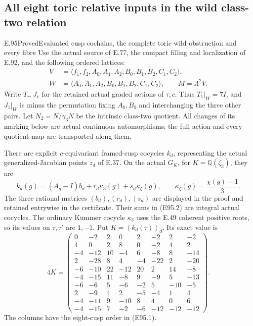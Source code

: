 \subsection{All eight toric relative inputs in the wild class-two relation}

\begin{statement}{E.95}{Proved}{Evaluated cusp cochains, the complete toric wild obstruction and every fibre}
Use the actual source of E.77, the compact filling and localization
of E.92, and the following ordered lattices:
\[
 \begin{aligned}
 V&=\langle f_1,f_2,A_0,A_1,A_2,B_0,B_1,B_2,C_1,C_2\rangle,\\
 W&=\langle A_0,A_1,A_2,B_0,B_1,B_2,C_1,C_2\rangle,
 \qquad M=\Lambda^2V.
 \end{aligned}
 \tag{E95.1}
\]
Write $T_r,J_r$ for the retained actual graded actions of
$\tau,c$. Thus $T_1|_W=7I$, and $J_1|_W$ is minus the
permutation fixing $A_0,B_0$ and interchanging the three other
pairs. Let $N_2=N/\gamma_3N$ be the intrinsic class-two quotient.
All changes of its marking below are actual continuous
automorphisms; the full action and every quotient map are
transported along them.

There are explicit $c$-equivariant framed-cusp cocycles
$k_d$, representing the actual generalized-Jacobian points
$z_d$ of E.37. On the actual $G_K$, for $K=\mathbb Q(\zeta_3)$,
they are
\[
 k_d(g)=(A_g-I)b_d+r_d\kappa_3(g)+s_d\kappa_\zeta(g),
 \qquad \kappa_\zeta(g)=\frac{\chi(g)-1}{3}.
 \tag{E95.2}
\]
The three rational matrices $(b_d),(r_d),(s_d)$ are displayed
in the proof and retained entrywise in the certificate.
Their sums in (E95.2) are integral actual cocycles. The
ordinary Kummer cocycle $\kappa_3$ uses the E.49 coherent
positive roots, so its values on $\tau,\tau'$ are $1,-1$.
Put $K=(k_d(\tau))_d$. Its exact value is
\[
4K=\begin{pmatrix}
0&-2&2&0&2&-2&2&-2\\
4&0&2&8&0&-2&4&2\\
-4&-12&10&-4&6&-8&8&-14\\
2&-28&8&4&-4&-22&2&-20\\
-6&-10&22&-12&20&2&14&-8\\
-4&-15&11&-8&9&-9&5&-13\\
-6&-6&5&-6&-2&5&-10&-5\\
2&-9&4&2&-5&-4&1&4\\
-4&-11&9&-10&8&4&0&6\\
-4&-15&7&-2&-6&-12&-12&-12
\end{pmatrix}.
 \tag{E95.3}
\]
The columns have the eight-cusp order in (E95.1).


\end{statement}

